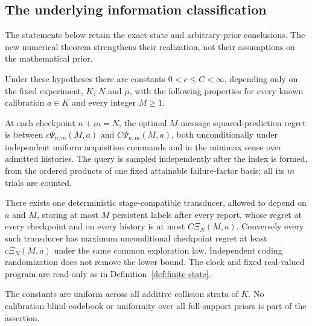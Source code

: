 \subsection{The underlying information classification}
The statements below retain the exact-state and arbitrary-prior conclusions.
The new numerical theorem strengthens their realization, not their assumptions
on the mathematical prior.

\begin{theorem}\label{thm:resolution-main}
Under these hypotheses there are constants $0<c\le C<\infty$,
depending only on the fixed experiment, $K$, $N$ and $\mu$, with the
following properties for every known calibration $a\in K$ and every
integer $M\ge1$.

At each checkpoint $n+m=N$, the optimal $M$-message squared-prediction
regret is between $c\Psi_{n,m}(M,a)$ and $C\Psi_{n,m}(M,a)$,
both unconditionally under independent uniform acquisition commands and
in the minimax sense over admitted histories. The query is sampled
independently after the index is formed, from the ordered products of
one fixed attainable failure-factor basis; all its $m$ trials are counted.

There exists one deterministic stage-compatible transducer, allowed to
depend on $a$ and $M$, storing at most $M$ persistent labels after
every report, whose regret at every checkpoint and on every history is
at most $C\Xi_N(M,a)$. Conversely every such transducer has maximum
unconditional checkpoint regret at least $c\Xi_N(M,a)$ under the
same common exploration law. Independent coding randomization does not
remove the lower bound. The clock and fixed real-valued program are
read-only as in Definition~\ref{def:finite-state}.

The constants are uniform across all additive collision strata of $K$.
No calibration-blind codebook or uniformity over all full-support priors
is part of the assertion.
\end{theorem}

